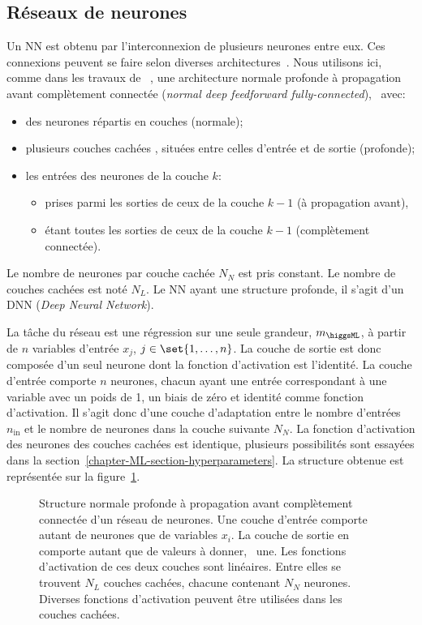 \subsection{Réseaux de neurones}\label{chapter-ML-section-DNN-networks}
Un NN est obtenu par l'interconnexion de plusieurs neurones entre eux.
Ces connexions peuvent se faire selon diverses architectures~\cite{DNN}.
Nous utilisons ici,
comme dans les travaux de \citeauthor{BARTSCHI201929}~\cite{BARTSCHI201929},
une architecture
normale profonde à propagation avant complètement connectée (\emph{normal deep feedforward fully-connected}),
\ie\ avec:
\begin{itemize}
\item des neurones répartis en couches (normale);
\item plusieurs couches \og cachées \fg, situées entre celles d'entrée et de sortie (profonde);
\item les entrées des neurones de la couche $k$:
\begin{itemize}
\item prises parmi les sorties de ceux de la couche $k-1$ (à propagation avant),
\item étant toutes les sorties de ceux de la couche $k-1$ (complètement connectée).
\end{itemize}
\end{itemize}
Le nombre de neurones par couche cachée $N_N$ est pris constant.
Le nombre de couches cachées est noté $N_L$.
Le NN ayant une structure profonde, il s'agit d'un DNN (\emph{Deep Neural Network}).
\par
La tâche du réseau est une régression sur une seule grandeur, $m_{\higgsML}$, à partir de $n$ variables d'entrée $x_j$, $j\in\set{1,\ldots,n}$.
La couche de sortie est donc composée d'un seul neurone dont la fonction d'activation est l'identité.
La couche d'entrée comporte $n$ neurones, chacun ayant une entrée correspondant à une variable avec un poids de 1, un biais de zéro et identité comme fonction d'activation.
Il s'agit donc d'une couche d'adaptation entre le nombre d'entrées $n_\text{in}$ et le nombre de neurones dans la couche suivante $N_N$.
La fonction d'activation des neurones des couches cachées est identique, plusieurs possibilités sont essayées dans la section~\ref{chapter-ML-section-hyperparameters}.
La structure obtenue est représentée sur la figure~\ref{fig-neural_network_fr}.
\begin{figure}[h]
\centering

\caption[Structure d'un réseau de neurones.]{Structure normale profonde à propagation avant complètement connectée d'un réseau de neurones. Une couche d'entrée comporte autant de neurones que de variables $x_i$. La couche de sortie en comporte autant que de valeurs à donner, \ie\ une. Les fonctions d'activation de ces deux couches sont linéaires. Entre elles se trouvent $N_L$ couches cachées, chacune contenant $N_N$ neurones. Diverses fonctions d'activation peuvent être utilisées dans les couches cachées.}
\label{fig-neural_network_fr}
\end{figure}